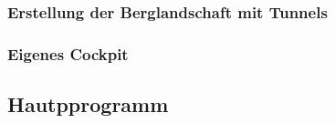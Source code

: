 \subsubsection{Erstellung der Berglandschaft mit Tunnels}

\subsubsection{Eigenes Cockpit}




\subsection{Hautpprogramm}



